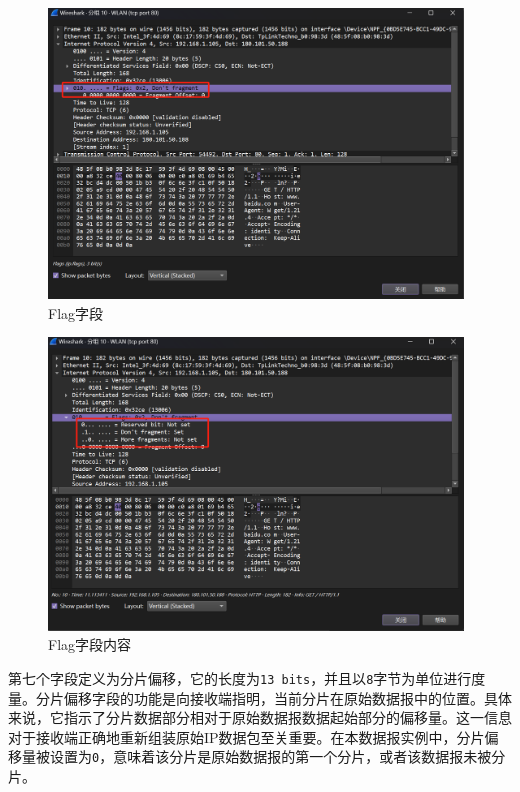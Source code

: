 \documentclass{article}
\begin{document}
	\begin{figure}[H]
		\centering
		\includegraphics[width=11cm]{images/12. Flag字段.jpg}
		\caption{Flag字段}
	\end{figure}
	
	\begin{figure}[H]
		\centering
		\includegraphics[width=11cm]{images/13. Flag字段内容.jpg}
		\caption{Flag字段内容}
	\end{figure}
	
	第七个字段定义为分片偏移，它的长度为\texttt{13 bits}，并且以\texttt{8}字节为单位进行度量。分片偏移字段的功能是向接收端指明，当前分片在原始数据报中的位置。具体来说，它指示了分片数据部分相对于原始数据报数据起始部分的偏移量。这一信息对于接收端正确地重新组装原始IP数据包至关重要。在本数据报实例中，分片偏移量被设置为\texttt{0}，意味着该分片是原始数据报的第一个分片，或者该数据报未被分片。
	
\end{document}
